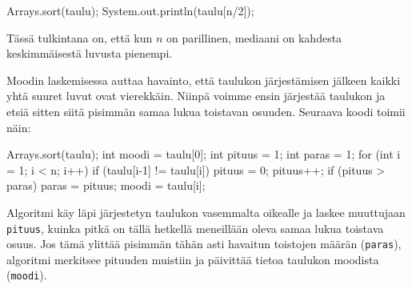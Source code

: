 \begin{code}
Arrays.sort(taulu);
System.out.println(taulu[n/2]);
\end{code}

Tässä tulkintana on, että kun $n$ on parillinen, mediaani
on kahdesta keskimmäisestä luvusta pienempi.

Moodin laskemisessa auttaa havainto, että taulukon järjestämisen
jälkeen kaikki yhtä suuret luvut ovat vierekkäin.
Niinpä voimme ensin järjestää taulukon ja etsiä sitten siitä
pisimmän samaa lukua toistavan osuuden.
Seuraava koodi toimii näin:

\begin{code}
Arrays.sort(taulu);
int moodi = taulu[0];
int pituus = 1;
int paras = 1;
for (int i = 1; i < n; i++) {
    if (taulu[i-1] != taulu[i]) {
        pituus = 0;
    }
    pituus++;
    if (pituus > paras) {
        paras = pituus;
        moodi = taulu[i];
    }
}
\end{code}

Algoritmi käy läpi järjestetyn taulukon vasemmalta oikealle
ja laskee muuttujaan \texttt{pituus}, kuinka pitkä on tällä
hetkellä meneillään oleva samaa lukua toistava osuus.
Jos tämä ylittää pisimmän tähän asti havaitun toistojen
määrän (\texttt{paras}), algoritmi merkitsee pituuden muistiin
ja päivittää tietoa taulukon moodista (\texttt{moodi}).
